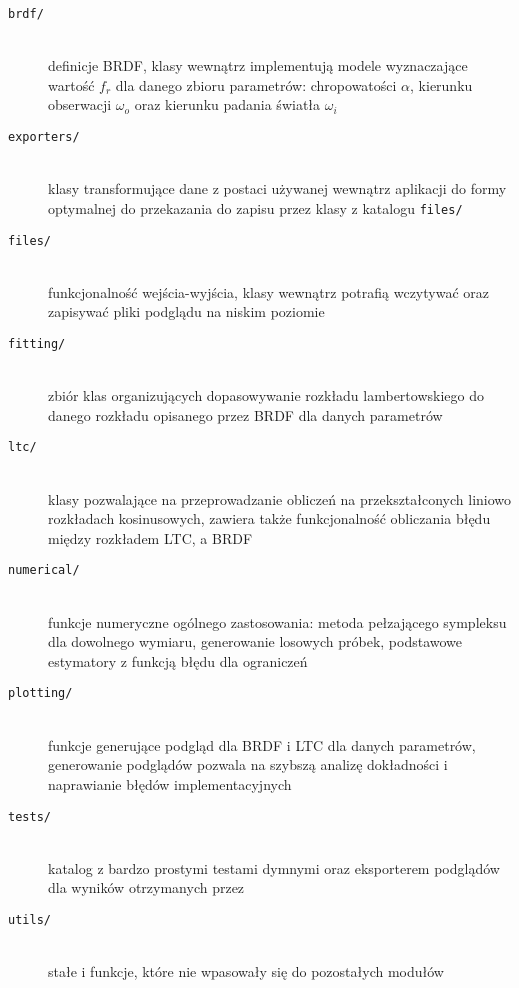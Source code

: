 \documentclass[../main.tex]{subfiles}
\begin{document}
\begin{description}
   
    \item[\texttt{brdf/}] \hfill\\
    definicje BRDF, klasy wewnątrz implementują modele wyznaczające wartość $f_r$ dla danego zbioru parametrów: chropowatości $\alpha$, kierunku obserwacji $\omega_o$ oraz kierunku padania światła $\omega_i$
    
    \item[\texttt{exporters/}] \hfill\\
    klasy transformujące dane z postaci używanej wewnątrz aplikacji do formy optymalnej do przekazania do zapisu przez klasy z katalogu \texttt{files/}
    
    \item[\texttt{files/}] \hfill\\ 
    funkcjonalność wejścia-wyjścia, klasy wewnątrz potrafią wczytywać oraz zapisywać pliki podglądu na niskim poziomie
    
    \item[\texttt{fitting/}] \hfill\\
    zbiór klas organizujących dopasowywanie rozkładu lambertowskiego do danego rozkładu opisanego przez BRDF dla danych parametrów
    
    \item[\texttt{ltc/}] \hfill\\
    klasy pozwalające na przeprowadzanie obliczeń na przekształconych liniowo rozkładach kosinusowych, zawiera także funkcjonalność obliczania błędu między rozkładem LTC, a BRDF
     
    \item[\texttt{numerical/}] \hfill\\
    funkcje numeryczne ogólnego zastosowania: metoda pełzającego sympleksu dla dowolnego wymiaru, generowanie losowych próbek, podstawowe estymatory z funkcją błędu dla ograniczeń
    
    \item[\texttt{plotting/}] \hfill\\
    funkcje generujące podgląd dla BRDF i LTC dla danych parametrów, generowanie podglądów pozwala na szybszą analizę dokładności i naprawianie błędów implementacyjnych
    
    \item[\texttt{tests/}] \hfill\\
    katalog z bardzo prostymi testami dymnymi oraz eksporterem podglądów dla wyników otrzymanych przez \cite{ltc_heitz} 
    
    \item[\texttt{utils/}] \hfill\\
    stałe i funkcje, które nie wpasowały się do pozostałych modułów
\end{description}
\end{document}
